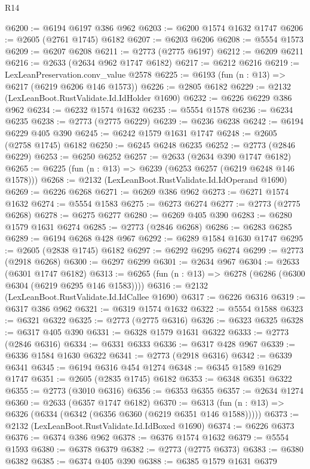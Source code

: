 \begin{lexlean}{R14}
\begin{coremodule}
@6200 := @6194 @6197 @386 @962
@6203 := @6200 @1574 @1632 @1747
@6206 := @2605 (@2761 @1745) @6182
@6207 := @6203 @6206
@6208 := @5554 @1573
@6209 := @6207 @6208
@6211 := @2773 (@2775 @6197)
@6212 := @6209 @6211
@6216 := @2633 (@2634 @962 @1747 @6182)
@6217 := @6212 @6216
@6219 := LexLeanPreservation.conv_value @2578
@6225 := @6193 (fun (n : @13) => @6217 (@6219 @6206 @146 @1573))
@6226 := @2805 @6182
@6229 := @2132 (LexLeanBoot.RustValidate.Id.IdHolder @1690)
@6232 := @6226 @6229 @386 @962
@6234 := @6232 @1574 @1632
@6235 := @5554 @1578
@6236 := @6234 @6235
@6238 := @2773 (@2775 @6229)
@6239 := @6236 @6238
@6242 := @6194 @6229 @405 @390
@6245 := @6242 @1579 @1631 @1747
@6248 := @2605 (@2758 @1745) @6182
@6250 := @6245 @6248 @6235
@6252 := @2773 (@2846 @6229)
@6253 := @6250 @6252
@6257 := @2633 (@2634 @390 @1747 @6182)
@6265 := @6225 (fun (n : @13) => @6239 (@6253 @6257 (@6219 @6248 @146 @1578)))
@6268 := @2132 (LexLeanBoot.RustValidate.Id.IdOperand @1690)
@6269 := @6226 @6268
@6271 := @6269 @386 @962
@6273 := @6271 @1574 @1632
@6274 := @5554 @1583
@6275 := @6273 @6274
@6277 := @2773 (@2775 @6268)
@6278 := @6275 @6277
@6280 := @6269 @405 @390
@6283 := @6280 @1579 @1631 @6274
@6285 := @2773 (@2846 @6268)
@6286 := @6283 @6285
@6289 := @6194 @6268 @428 @967
@6292 := @6289 @1584 @1630 @1747
@6295 := @2605 (@2838 @1745) @6182
@6297 := @6292 @6295 @6274
@6299 := @2773 (@2918 @6268)
@6300 := @6297 @6299
@6301 := @2634 @967
@6304 := @2633 (@6301 @1747 @6182)
@6313 := @6265 (fun (n : @13) => @6278 (@6286 (@6300 @6304 (@6219 @6295 @146 @1583))))
@6316 := @2132 (LexLeanBoot.RustValidate.Id.IdCallee @1690)
@6317 := @6226 @6316
@6319 := @6317 @386 @962
@6321 := @6319 @1574 @1632
@6322 := @5554 @1588
@6323 := @6321 @6322
@6325 := @2773 (@2775 @6316)
@6326 := @6323 @6325
@6328 := @6317 @405 @390
@6331 := @6328 @1579 @1631 @6322
@6333 := @2773 (@2846 @6316)
@6334 := @6331 @6333
@6336 := @6317 @428 @967
@6339 := @6336 @1584 @1630 @6322
@6341 := @2773 (@2918 @6316)
@6342 := @6339 @6341
@6345 := @6194 @6316 @454 @1274
@6348 := @6345 @1589 @1629 @1747
@6351 := @2605 (@2835 @1745) @6182
@6353 := @6348 @6351 @6322
@6355 := @2773 (@3010 @6316)
@6356 := @6353 @6355
@6357 := @2634 @1274
@6360 := @2633 (@6357 @1747 @6182)
@6370 := @6313 (fun (n : @13) => @6326 (@6334 (@6342 (@6356 @6360 (@6219 @6351 @146 @1588)))))
@6373 := @2132 (LexLeanBoot.RustValidate.Id.IdBoxed @1690)
@6374 := @6226 @6373
@6376 := @6374 @386 @962
@6378 := @6376 @1574 @1632
@6379 := @5554 @1593
@6380 := @6378 @6379
@6382 := @2773 (@2775 @6373)
@6383 := @6380 @6382
@6385 := @6374 @405 @390
@6388 := @6385 @1579 @1631 @6379

\end{coremodule}
\end{lexlean}
